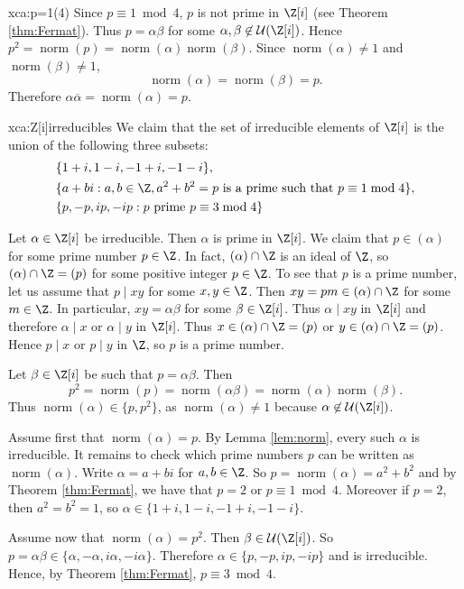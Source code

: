 \begin{sol}{xca:p=1(4)}
    Since $p\equiv1\bmod4$, 
    $p$ is not prime in $\Z[i]$ (see Theorem \ref{thm:Fermat}). 
    Thus $p=\alpha\beta$ for some $\alpha,\beta\not\in\mathcal{U}(\Z[i])$. Hence $p^2=\operatorname{norm}(p)=\operatorname{norm}(\alpha)\operatorname{norm}(\beta)$. Since 
    $\operatorname{norm}(\alpha)\ne 1$ and $\operatorname{norm}(\beta)\ne 1$, 
    \[ 
    \operatorname{norm}(\alpha)=\operatorname{norm}(\beta)=p.
    \]
    Therefore $\alpha\overline{\alpha}=\operatorname{norm}(\alpha)=p$. 
\end{sol}

\begin{sol}{xca:Z[i]irreducibles}
    We claim that the set of irreducible
    elements of $\Z[i]$ 
    is the union of the following three subsets:
    \begin{align*}      
    &\{1+i,1-i,-1+i,-1-i\},\\
    &\{a+bi: a,b\in \Z, a^2+b^2=p \text{ is a prime
    such that }p\equiv1\bmod 4\},\\
    &\{p,-p,ip,-ip: p \text{ prime }p\equiv3\bmod 4\}
    \end{align*}
    
    Let $\alpha\in\Z[i]$ be irreducible. Then $\alpha$ is
    prime in $\Z[i]$. We claim that $p\in (\alpha)$ for some
    prime number $p\in\Z$. In fact, 
    $(\alpha)\cap\Z$ is an ideal of $\Z$, so 
    $(\alpha)\cap\Z=(p)$ for some positive integer $p\in\Z$. 
    To see that $p$ is a prime number, let 
    us assume that $p\mid xy$ for some $x,y\in\Z$. Then 
    $xy=pm\in (\alpha)\cap\Z$ for some $m\in\Z$. In particular, 
    $xy=\alpha\beta$ for some $\beta\in\Z[i]$. Thus $\alpha\mid xy$
    in $\Z[i]$ and therefore 
    $\alpha\mid x$ or $\alpha\mid y$ in $\Z[i]$. Thus 
    $x\in (\alpha)\cap\Z=(p)$ or $y\in(\alpha)\cap\Z=(p)$. Hence
    $p\mid x$ or $p\mid y$ in $\Z$, so $p$ is a prime number. 

    Let $\beta\in\Z[i]$ be such that $p=\alpha\beta$. 
    Then 
    \[
    p^2=\operatorname{norm}(p)=\operatorname{norm}(\alpha\beta)=\operatorname{norm}(\alpha)\operatorname{norm}(\beta).
    \]
    Thus $\operatorname{norm}(\alpha)\in\{p,p^2\}$, 
    as $\operatorname{norm}(\alpha)\ne1$ because $\alpha\not\in\mathcal{U}(\Z[i])$. 
    
    Assume first that $\operatorname{norm}(\alpha)=p$. By Lemma \ref{lem:norm},
    every such $\alpha$ is irreducible. It remains to check which prime numbers $p$ can be written as $\operatorname{norm}(\alpha)$.
    Write $\alpha=a+bi$ 
    for $a,b\in\Z$. So $p=\operatorname{norm}(\alpha)=a^2+b^2$ 
    and by Theorem \ref{thm:Fermat}, we have that $p=2$
    or $p\equiv1\bmod 4$.
    Moreover if $p=2$, then $a^2=b^2=1$, so $\alpha\in\{1+i,1-i,-1+i,-1-i\}$.
    
    Assume now that $\operatorname{norm}(\alpha)=p^2$. Then $\beta\in\mathcal{U}(\Z[i])$.
    So $p=\alpha\beta\in\{\alpha,-\alpha, i\alpha,-i\alpha\}$.
    Therefore $\alpha\in\{p,-p,ip,-ip\}$ and is irreducible. 
    Hence, by Theorem \ref{thm:Fermat}, $p\equiv3\bmod 4$.
\end{sol}   

